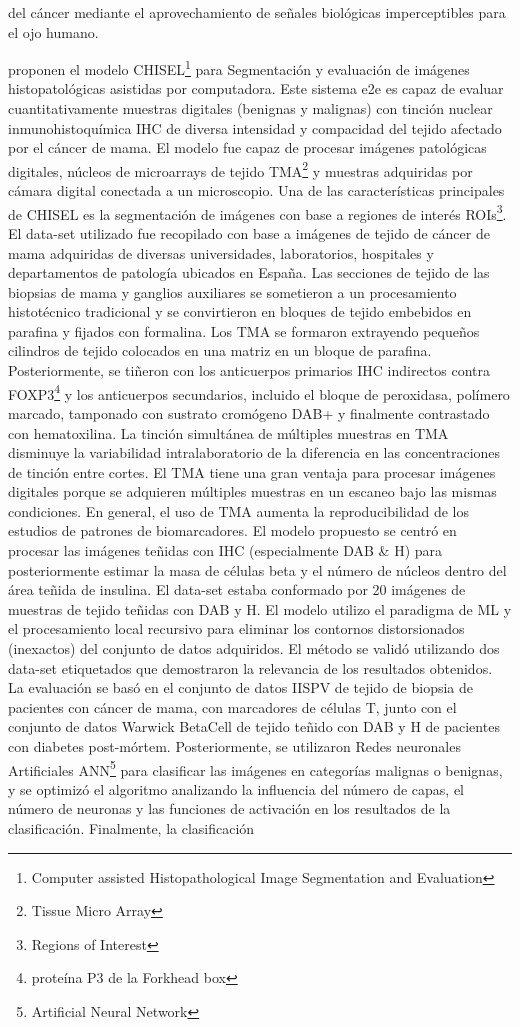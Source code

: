 del cáncer mediante el aprovechamiento de señales biológicas imperceptibles para el ojo humano.

\cite{Roszkowiak2021} proponen el modelo CHISEL\footnote{Computer assisted Histopathological Image Segmentation and Evaluation} para Segmentación y evaluación de imágenes histopatológicas asistidas por computadora. Este sistema e2e es capaz de evaluar cuantitativamente muestras digitales (benignas y malignas) con tinción nuclear inmunohistoquímica IHC de diversa intensidad y compacidad del tejido afectado por el cáncer de mama. El modelo fue capaz de procesar imágenes patológicas digitales, núcleos de microarrays de tejido TMA\footnote{Tissue Micro Array} y muestras adquiridas por cámara digital conectada a un microscopio. Una de las características principales de CHISEL es la segmentación de imágenes con base a regiones de interés ROIs\footnote{Regions of Interest}. El data-set utilizado fue recopilado con base a imágenes de tejido de cáncer de mama adquiridas de diversas universidades, laboratorios, hospitales y departamentos de patología ubicados en España. Las secciones de tejido de las biopsias de mama y ganglios auxiliares se sometieron a un procesamiento histotécnico tradicional y se convirtieron en bloques de tejido embebidos en parafina y fijados con formalina. Los TMA se formaron extrayendo pequeños cilindros de tejido colocados en una matriz en un bloque de parafina. Posteriormente, se tiñeron con los anticuerpos primarios IHC indirectos contra FOXP3\footnote{proteína P3 de la Forkhead box} y los anticuerpos secundarios, incluido el bloque de peroxidasa, polímero marcado, tamponado con sustrato cromógeno DAB+ y finalmente contrastado con hematoxilina. La tinción simultánea de múltiples muestras en TMA disminuye la variabilidad intralaboratorio de la diferencia en las concentraciones de tinción entre cortes. El TMA tiene una gran ventaja para procesar imágenes digitales porque se adquieren múltiples muestras en un escaneo bajo las mismas condiciones. En general, el uso de TMA aumenta la reproducibilidad de los estudios de patrones de biomarcadores. El modelo propuesto se centró en procesar las imágenes teñidas con IHC (especialmente DAB \& H) para posteriormente estimar la masa de células beta y el número de núcleos dentro del área teñida de insulina. El data-set estaba conformado por 20 imágenes de muestras de tejido teñidas con DAB y H. El modelo utilizo el paradigma de ML y el procesamiento local recursivo para eliminar los contornos distorsionados (inexactos) del conjunto de datos adquiridos. El método se validó utilizando dos data-set etiquetados que demostraron la relevancia de los resultados obtenidos. La evaluación se basó en el conjunto de datos IISPV de tejido de biopsia de pacientes con cáncer de mama, con marcadores de células T, junto con el conjunto de datos Warwick BetaCell de tejido teñido con DAB y H de pacientes con diabetes post-mórtem. Posteriormente, se utilizaron Redes neuronales Artificiales ANN\footnote{Artificial Neural Network} para clasificar las imágenes en categorías malignas o benignas, y se optimizó el algoritmo analizando la influencia del número de capas, el número de neuronas y las funciones de activación en los resultados de la clasificación. Finalmente, la clasificación 